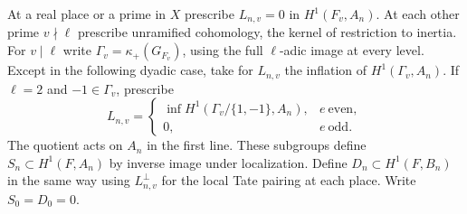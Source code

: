 \documentclass[a4paper,11pt]{article}
\theoremstyle{definition}
\theoremstyle{remark}
\numberwithin{equation}{section}
\begin{document}
At a real place or a prime in \(X\) prescribe
\(L_{n,v}=0\) in \(H^1(F_v,A_n)\). At each other prime
\(v\nmid\ell\) prescribe unramified cohomology, the kernel of
restriction to inertia. For \(v\mid\ell\) write
\(\Gamma_v=\kappa_+(G_{F_v})\), using the full \(\ell\)-adic
image at every level. Except in the following dyadic case,
take for \(L_{n,v}\) the inflation of \(H^1(\Gamma_v,A_n)\).
If \(\ell=2\) and \(-1\in\Gamma_v\), prescribe
\[
 L_{n,v}=
 \begin{cases}
  \operatorname{inf}H^1(\Gamma_v/\{1,-1\},A_n),& e\ \text{even},\\
  0,& e\ \text{odd}.
 \end{cases}
\]
The quotient acts on \(A_n\) in the first line. These subgroups
define \(S_n\subset H^1(F,A_n)\) by inverse image under
localization. Define \(D_n\subset H^1(F,B_n)\) in the same
way using \(L_{n,v}^{\perp}\) for the local Tate pairing at
each place. Write \(S_0=D_0=0\).
\end{document}
